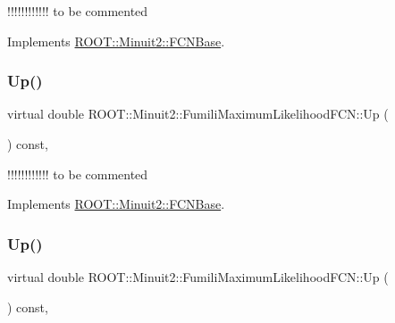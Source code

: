!!!!!!!!!!!! to be commented 

Implements \mbox{\hyperlink{classROOT_1_1Minuit2_1_1FCNBase_a04ef08ddad92ce8d89d498efbe021c39}{R\+O\+O\+T\+::\+Minuit2\+::\+F\+C\+N\+Base}}.

\mbox{\label{classROOT_1_1Minuit2_1_1FumiliMaximumLikelihoodFCN_ab945da701895bfba143da08f76ba2d05}} 
\subsubsection{\texorpdfstring{Up()}{Up()}\hspace{0.1cm}{\footnotesize\ttfamily [2/3]}}
{\footnotesize\ttfamily virtual double R\+O\+O\+T\+::\+Minuit2\+::\+Fumili\+Maximum\+Likelihood\+F\+C\+N\+::\+Up (\begin{DoxyParamCaption}{ }\end{DoxyParamCaption}) const\hspace{0.3cm}{\ttfamily [inline]}, {\ttfamily [virtual]}}

!!!!!!!!!!!! to be commented 

Implements \mbox{\hyperlink{classROOT_1_1Minuit2_1_1FCNBase_a04ef08ddad92ce8d89d498efbe021c39}{R\+O\+O\+T\+::\+Minuit2\+::\+F\+C\+N\+Base}}.

\mbox{\label{classROOT_1_1Minuit2_1_1FumiliMaximumLikelihoodFCN_ab945da701895bfba143da08f76ba2d05}} 
\subsubsection{\texorpdfstring{Up()}{Up()}\hspace{0.1cm}{\footnotesize\ttfamily [3/3]}}
{\footnotesize\ttfamily virtual double R\+O\+O\+T\+::\+Minuit2\+::\+Fumili\+Maximum\+Likelihood\+F\+C\+N\+::\+Up (\begin{DoxyParamCaption}{ }\end{DoxyParamCaption}) const\hspace{0.3cm}{\ttfamily [inline]}, {\ttfamily [virtual]}}

